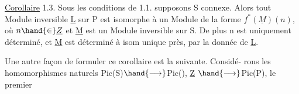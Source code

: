 \uline{Corollaire} 1.3. Sous les conditions de 1.1. supposons S connexe. Alors
tout Module inversible \underline{L} sur P est isomorphe à un Module de la forme
$f^*(\underline{M})(n)$, où $n\hand{\in}\underline{Z}$ et \underline{M} est un Module inversible sur S. De plus n est
uniquement déterminé, et \underline{M} est déterminé à isom unique près, par la donnée
de \underline{L}.\margin{\ensuremath{\swarrow}}

Une autre façon de formuler ce corollaire est la suivante. Considé-%
rons les homomorphismes naturels Pic(S)$\hand{\longrightarrow}$Pic(), \underline{Z} $\hand{\longrightarrow}$Pic(P), le premier\margin{\ensuremath{\swarrow}}
